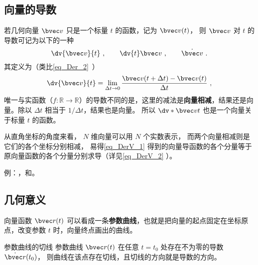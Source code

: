 
\begin{issues}
\end{issues}


\subsection{向量的导数}

若几何向量 $\bvec v$ 只是一个标量 $t$ 的函数，记为 $\bvec v(t)$， 则 $\bvec v$ 对 $t$ 的导数可记为以下的一种
\begin{equation}
\dv{\bvec v}{t}~, \qquad \dv{t}\bvec v~, \qquad \dot{\bvec v}~.
\end{equation}
其定义为（类比\autoref{eq_Der_2}~）
\begin{equation}\label{eq_DerV_1}
\dv{\bvec v}{t} = \lim_{\Delta t \to 0} \frac{\bvec v ( t + \Delta t) - \bvec v(t)}{\Delta t}~,
\end{equation}
唯一与实函数（$f:\mathbb R \to \mathbb R$）的导数不同的是，这里的减法是\textbf{向量相减}，结果还是向量。除以 $\Delta t$ 相当于 $1/\Delta t$，结果也是向量。 所以 $\dv*{\bvec v}{t}$ 也是一个向量关于标量 $t$ 的函数。

从直角坐标的角度来看， $N$ 维向量可以用 $N$ 个实数表示， 而两个向量相减则是它们的各个坐标分别相减， 易得\autoref{eq_DerV_1} 得到的向量导函数的各个分量等于原向量函数的各个分量分别求导（详见\autoref{eq_DerV_2} ）。

例：，和。

\subsection{几何意义}
向量函数 $\bvec r(t)$ 可以看成一条\textbf{参数曲线}，也就是把向量的起点固定在坐标原点，改变参数 $t$ 时，向量终点画出的曲线。

\begin{theorem}{参数曲线的切线}
参数曲线 $\bvec r(t)$ 在任意 $t=t_0$ 处存在不为零的导数 $\dot{\bvec r}(t_0)$， 则曲线在该点存在切线，且切线的方向就是导数的方向。
\end{theorem}

